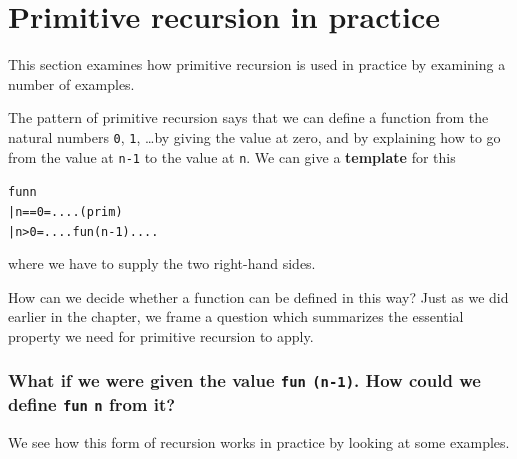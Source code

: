 \section{Primitive recursion in practice}

This section examines how primitive recursion is used in practice by
examining a number of examples.

The pattern of primitive recursion says that we can define a function
from the natural numbers \texttt{0}, \texttt{1}, \ldots by giving the
value at zero, and by explaining how to go from the value at
\texttt{n-1} to the value at \texttt{n}. We can give a \textbf{template} for this
\begin{alltt}
fun n
  | n==0        = ....\hfill(prim)
  | n>0         = .... fun (n-1) ....
\end{alltt}
where we have to supply the two right-hand sides.

How can we decide whether a function can be defined in this way? Just as we did
earlier in the chapter, we frame a question which summarizes the
essential property we need for 
primitive recursion to apply.

\subsubsection*{{\bfseries What if\/} we were given the value 
{\tt fun} {\tt (n-1)}. How could we define {\tt fun} {\tt n\/} from it?}

We see how this form of recursion works in practice by looking at some examples.

